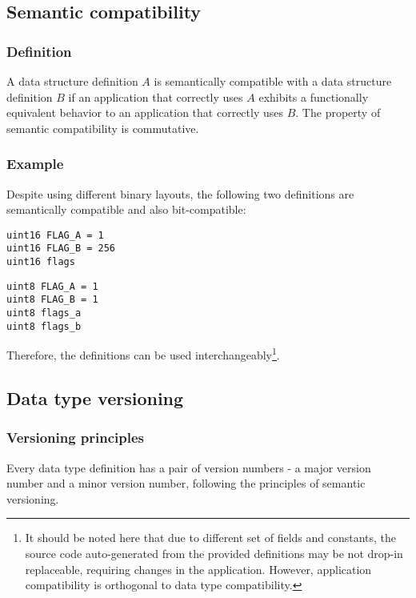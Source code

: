\subsection{Semantic compatibility}\label{sec:dsdl_semantic_compatibility}

\subsubsection{Definition}

A data structure definition $A$ is semantically compatible with a data structure definition $B$
if an application that correctly uses $A$ exhibits a functionally equivalent behavior to an application
that correctly uses $B$.
The property of semantic compatibility is commutative.

\subsubsection{Example}

Despite using different binary layouts, the following two definitions are semantically compatible
and also bit-compatible:

\begin{verbatim}
uint16 FLAG_A = 1
uint16 FLAG_B = 256
uint16 flags
\end{verbatim}

\begin{verbatim}
uint8 FLAG_A = 1
uint8 FLAG_B = 1
uint8 flags_a
uint8 flags_b
\end{verbatim}

Therefore, the definitions can be used
interchangeably\footnote{It should be noted here that due to different set of fields and constants,
the source code auto-generated from the provided definitions may be not drop-in replaceable,
requiring changes in the application. However, application compatibility is orthogonal to
data type compatibility.}.

\subsection{Data type versioning}

\subsubsection{Versioning principles}

Every data type definition has a pair of version numbers -
a major version number and a minor version number, following the principles of semantic versioning.

